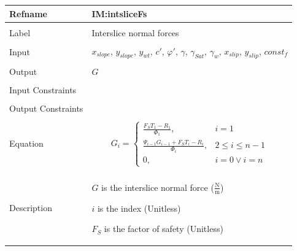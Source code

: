 \documentclass[12pt]{article}
\begin{document}
\noindent \begin{minipage}{\textwidth}
\begin{tabular}{p{} p{}}
\toprule \textbf{Refname} & \textbf{IM:intsliceFs}
\label{IM:intsliceFs}
\\ \midrule \\
Label & Interslice normal forces
        \\ \midrule \\
        Input & ${x_{slope}}$, ${y_{slope}}$, ${y_{wt}}$, $c'$, $φ'$, $γ$, ${γ_{Sat}}$, ${γ_{w}}$, ${x_{slip}}$, ${y_{slip}}$, $const_f$
                \\ \midrule \\
                Output & $G$
                         \\ \midrule \\
                         Input Constraints & \\ \midrule \\
                                             Output Constraints & \\ \midrule \\
                                                                  Equation & \begin{displaymath}
                                                                             G_{i}=\begin{cases}
\frac{{F_{S}} T_{1}-R_{1}}{Φ_{1}}, & i=1\\
\frac{Ψ_{i-1} G_{i-1}+{F_{S}} T_{i}-R_{i}}{Φ_{i}}, & 2\leq{}i\leq{}n-1\\
0, & i=0\lor{}i=n
\end{cases}
                                                                             \end{displaymath}
                                                                             \\ \midrule \\
                                                                             Description & \begin{symbDescription}
                                                                                           \item{$G$ is the interslice normal force ($\frac{\text{N}}{\text{m}}$)}
                                                                                           \item{$i$ is the index (Unitless)}
                                                                                           \item{${F_{S}}$ is the factor of safety (Unitless)}

\end{symbDescription}
\end{tabular}
\end{minipage}
\end{document}
